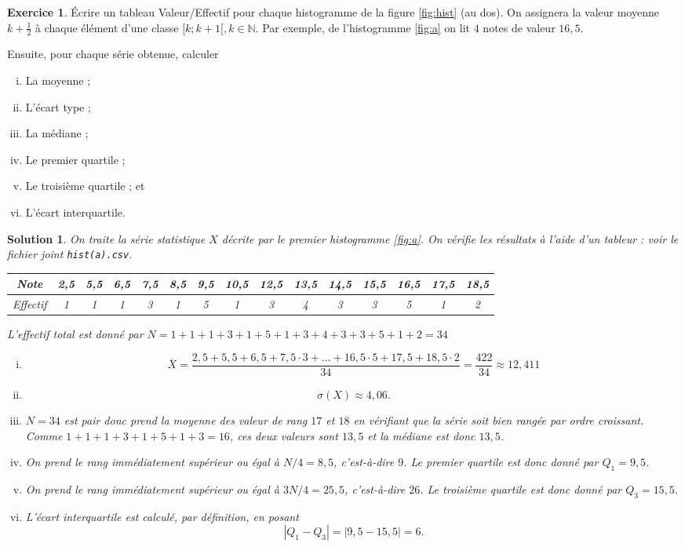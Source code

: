 \documentclass[a4paper, 14pt]{extarticle}
\theoremstyle{plain}
\newtheorem*{sol}{Solution}
\theoremstyle{definition}
\newtheorem{ex}{Exercice}
\newcommand{\N}{\mathbb{N}}
\newcommand{\exe}[2]{
		\begin{ex} #1  \end{ex}
		\begin{sol} #2 \end{sol}
	}
\newcommand{\exe}[2]{
		\begin{ex} #1  \end{ex}
	}
\begin{document}
\exe{
	Écrire un tableau Valeur/Effectif pour chaque histogramme de la figure \ref{fig:hist} (au dos).
	On assignera la valeur moyenne $k+\frac12$ à chaque élément d'une classe $[k; k+1[, k\in\N$.
	Par exemple, de l'histogramme \ref{fig:a} on lit $4$ notes de valeur $16,5$.
	
	Ensuite, pour chaque série obtenue, calculer
		\begin{multicols}{2}
		\begin{enumerate}[i)]
			\item La moyenne ;
			\item L'écart type ;
			\item La médiane ;
			\item Le premier quartile ;
			\item Le troisième quartile ; et
			\item L'écart interquartile.
		\end{enumerate}
		\end{multicols}
}{
	On traite la série statistique $X$ décrite par le premier histogramme \ref{fig:a}.
	On vérifie les résultats à l'aide d'un tableur : 
	voir le fichier joint \texttt{hist(a).csv}.
	
		\begin{center}
		\begin{tabular}{|c|c|c|c|c|c|c|c|c|c|c|c|c|c|c|}\hline
		Note & 2,5 & 5,5 & 6,5 &7,5 & 8,5 & 9,5 & 10,5 & 12,5 & 13,5 & 14,5 & 15,5 & 16,5 & 17,5 & 18,5 \\ \hline
		Effectif & 1 & 1 & 1 & 3 & 1 & 5 & 1 & 3 & 4 & 3 & 3 & 5 & 1 & 2 \\ \hline
		\end{tabular}
		\end{center}
		
	L'effectif total est donné par $N= 1+1+1+3+1+5+1+3+4+3+3+5+1+2 = 34$
	
		\begin{enumerate}[i)]
			\item
				\[ \overline{X} = \dfrac{2,5+5,5+6,5+7,5\cdot3 + \dots  + 16,5\cdot5 + 17,5+18,5\cdot2}{34} = \dfrac{422}{34} \approx 12,411 \]
			\item 
				\[ \sigma(X) \approx 4,06. \]
			\item 
				$N=34$ est pair donc prend la moyenne des valeur de rang $17$ et $18$ en vérifiant que la série soit bien rangée par ordre croissant.
				Comme $1+1+1+3+1+5+1+3 = 16$, ces deux valeurs sont $13,5$ et la médiane est donc $13,5$.
			\item 
				On prend le rang immédiatement supérieur ou égal à $N/4 = 8,5$, c'est-à-dire $9$.
				Le premier quartile est donc donné par $Q_1 = 9,5$.
			\item
				On prend le rang immédiatement supérieur ou égal à $3N/4 = 25,5$, c'est-à-dire $26$.
				Le troisième quartile est donc donné par $Q_3 = 15,5$. 
			\item
				L'écart interquartile est calculé, par définition, en posant
					\[ |Q_1 - Q_3| = |9,5 - 15,5| = 6. \]
				
		\end{enumerate}
}
\end{document}
